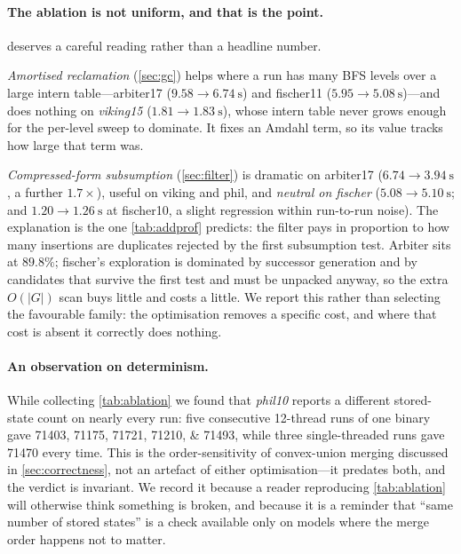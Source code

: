 \paragraph{The ablation is not uniform, and that is the point.}

 deserves a careful reading rather than a headline number.

\emph{Amortised reclamation} (\cref{sec:gc}) helps where a run has many BFS
levels over a large intern table---arbiter17 ($9.58 \to \SI{6.74}{\second}$) and
fischer11 ($5.95 \to \SI{5.08}{\second}$)---and does nothing on \emph{viking15}
($1.81 \to \SI{1.83}{\second}$), whose intern table never grows enough for the
per-level sweep to dominate.  It fixes an Amdahl term, so its value tracks how
large that term was.

\emph{Compressed-form subsumption} (\cref{sec:filter}) is dramatic on arbiter17
($6.74 \to \SI{3.94}{\second}$, a further $1.7\times$), useful on viking and
phil, and \emph{neutral on fischer} ($5.08 \to \SI{5.10}{\second}$; and
$1.20 \to \SI{1.26}{\second}$ at fischer10, a slight regression within
run-to-run noise).  The explanation is the one \cref{tab:addprof} predicts: the
filter pays in proportion to how many insertions are duplicates rejected by the
first subsumption test.  Arbiter sits at $89.8\%$; fischer's exploration is
dominated by successor generation and by candidates that survive the first test
and must be unpacked anyway, so the extra $O(|G|)$ scan buys little and costs a
little.  We report this rather than selecting the favourable family: the
optimisation removes a specific cost, and where that cost is absent it correctly
does nothing.

\paragraph{An observation on determinism.}  While collecting
\cref{tab:ablation} we found that \emph{phil10} reports a different stored-state
count on nearly every run: five consecutive 12-thread runs of one binary gave
\numlist{71403;71175;71721;71210;71493}, while three single-threaded runs gave
\num{71470} every time.  This is the order-sensitivity of convex-union merging
discussed in \cref{sec:correctness}, not an artefact of either optimisation---it
predates both, and the verdict is invariant.  We record it because a reader
reproducing \cref{tab:ablation} will otherwise think something is broken, and
because it is a reminder that ``same number of stored states'' is a check
available only on models where the merge order happens not to matter.

